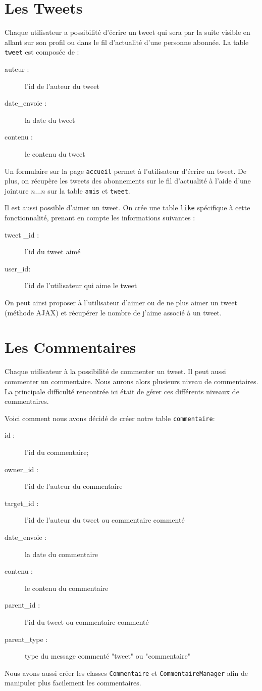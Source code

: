 \documentclass[a4paper, 12pt]{article}
\begin{document}
\begin{description}
\section{Les Tweets}			
Chaque utilisateur a possibilité d'écrire un tweet qui sera par la suite visible en allant sur son profil ou dans le fil d'actualité d'une personne abonnée. La table \texttt{tweet} est composée de :
\begin{description}
\item[auteur :] l’id de l’auteur du tweet
\item[date\_envoie :] la date du tweet
\item[contenu :] le contenu du tweet
\end{description}
Un formulaire sur la page \texttt{accueil} permet à l’utilisateur d’écrire un tweet.
De plus, on récupère les tweets des abonnements sur le fil d’actualité à l’aide d'une  jointure $n…n$ sur la table \texttt{amis} et \texttt{tweet}.

Il est aussi possible d'aimer un tweet. On crée une table \texttt{like} spécifique à cette fonctionnalité, prenant en compte les informations suivantes :
\begin{description}
\item[tweet \_id :] l’id du tweet aimé
\item[user\_id:] l'id de l'utilisateur qui aime le tweet
\end{description}
On peut ainsi proposer à l'utilisateur d'aimer ou de ne plus aimer un tweet (méthode AJAX) et récupérer le nombre de j'aime associé à un tweet.



\section{Les Commentaires}	
Chaque utilisateur à la possibilité de commenter un tweet. Il peut aussi commenter un commentaire. Nous aurons alors plusieurs niveau de commentaires. La principale difficulté rencontrée ici était de gérer ces différents niveaux de commentaires.

Voici comment nous avons décidé de créer notre table \texttt{commentaire}:
\begin{description}
\item[id :] l'id du commentaire;
\item[owner\_id :] l'id de l'auteur du commentaire
\item[target\_id :] l'id de l'auteur du tweet ou commentaire commenté
\item[date\_envoie :] la date du commentaire
\item[contenu :] le contenu du commentaire
\item[parent\_id :] l'id du tweet ou commentaire commenté
\item[parent\_type :] type du message commenté "tweet" ou "commentaire"
\end{description}
Nous avons aussi créer les classes \texttt{Commentaire} et \texttt{CommentaireManager} afin de manipuler plus facilement les commentaires.


\end{description}
\end{document}
